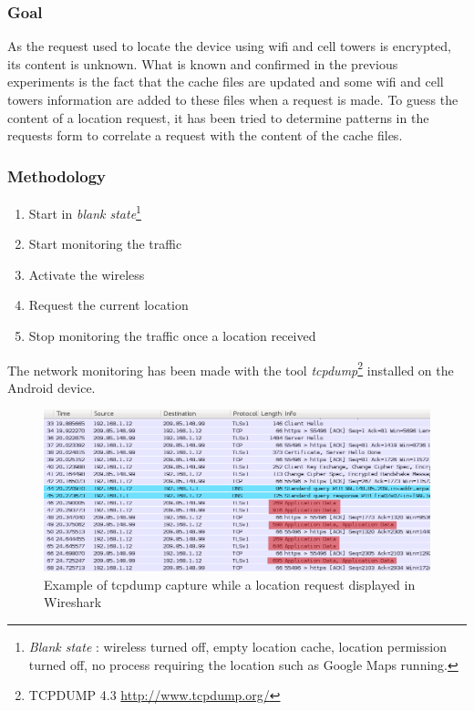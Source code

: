 \subsubsection{Goal}

As the request used to locate the device using wifi and cell towers is encrypted, its content is unknown.
What is known and confirmed in the previous experiments is the fact that the cache files are updated and some wifi and cell towers information are added to these files when a request is made.
To guess the content of a location request, it has been tried to determine patterns in the requests form to correlate a request with the content of the cache files.

\subsubsection{Methodology}

\begin{enumerate}
\item Start in \emph{blank state}\footnote{\emph{Blank state} : wireless turned off, empty location cache, location permission turned off, no process requiring the location such as Google Maps running.}
\item Start monitoring the traffic
\item Activate the wireless
\item Request the current location
\item Stop monitoring the traffic once a location received
\end{enumerate}

The network monitoring has been made with the tool \emph{tcpdump}\footnote{TCPDUMP 4.3 \url{http://www.tcpdump.org/}} installed on the Android device.

\begin{figure}[h]
  \centering
  \includegraphics[width=\textwidth]{images/trace2.png}
  \caption{Example of tcpdump capture while a location request displayed in Wireshark}
  \label{fig:loc-req-tcpdump}
\end{figure}

